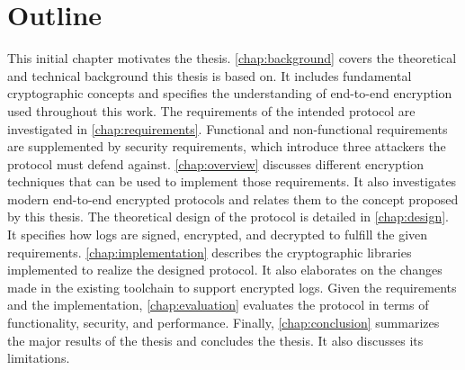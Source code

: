 \documentclass[../main.tex]{subfiles}
\begin{document}
\section{Outline}
This initial chapter motivates the thesis.
\cref{chap:background} covers the theoretical and technical background this thesis is based on.
It includes fundamental cryptographic concepts and specifies the understanding of end-to-end encryption used throughout this work.
The requirements of the intended protocol are investigated in \cref{chap:requirements}.
Functional and non-functional requirements are supplemented by security requirements, which introduce three attackers the protocol must defend against.
\cref{chap:overview} discusses different encryption techniques that can be used to implement those requirements.
It also investigates modern end-to-end encrypted protocols and relates them to the concept proposed by this thesis.
The theoretical design of the protocol is detailed in \cref{chap:design}.
It specifies how logs are signed, encrypted, and decrypted to fulfill the given requirements.
\cref{chap:implementation} describes the cryptographic libraries implemented to realize the designed protocol.
It also elaborates on the changes made in the existing toolchain to support encrypted logs.
Given the requirements and the implementation, \cref{chap:evaluation} evaluates the protocol in terms of functionality, security, and performance.
Finally, \cref{chap:conclusion} summarizes the major results of the thesis and concludes the thesis. 
It also discusses its limitations.
\end{document}
